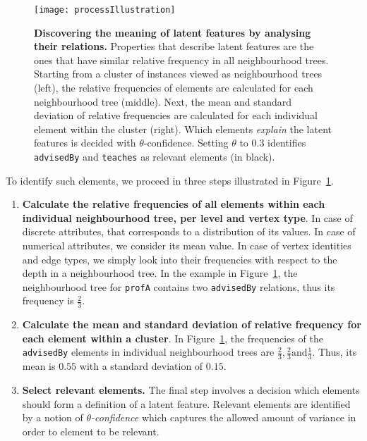 \begin{figure}[t]
	\centering
	\medskip
    \texttt{[image: processIllustration]}
    \caption{\textbf{Discovering the meaning of latent features by analysing their relations.} Properties that describe latent features are the ones that have similar relative frequency in all neighbourhood trees. Starting from a cluster of instances viewed as neighbourhood trees (left), the relative frequencies of elements are calculated for each neighbourhood tree (middle). Next, the mean and standard deviation of relative frequencies are calculated for each individual element within the cluster (right). Which elements \textit{explain} the latent features is decided with $\theta$-confidence. Setting $\theta$ to 0.3 identifies \texttt{advisedBy} and \texttt{teaches} as relevant elements (in black).}
    \label{fig:Process}
\end{figure}





To identify such elements, we proceed in three steps illustrated in Figure~\ref{fig:Process}.
\begin{enumerate}
	\item \textbf{Calculate the relative frequencies of all elements within each individual neighbourhood tree, per level and vertex type}.
    	In case of discrete attributes, that corresponds to a distribution of its values.
		In case of numerical attributes, we consider its mean value.
		In case of vertex identities and edge types, we simply look into their frequencies with respect to the depth in a neighbourhood tree.
        In the example in Figure~\ref{fig:Process}, the neighbourhood tree for \texttt{profA} contains two \texttt{advisedBy} relations, thus its frequency is $\frac{2}{3}$.
    \item \textbf{Calculate the mean and standard deviation of relative frequency for each element within a cluster}.
        In Figure~\ref{fig:Process}, the frequencies of the \texttt{advisedBy} elements in individual neighbourhood trees are $\frac{2}{3}, \frac{2}{3} \text{and} \frac{1}{3}$. Thus, its mean is $0.55$ with a standard deviation of $0.15$.
    \item \textbf{Select relevant elements.}
    	The final step involves a decision which elements should form a definition of a latent feature.
        Relevant elements are identified by a notion of \textit{$\theta$-confidence} which captures the allowed amount of variance in order to element to be relevant.
\end{enumerate}


